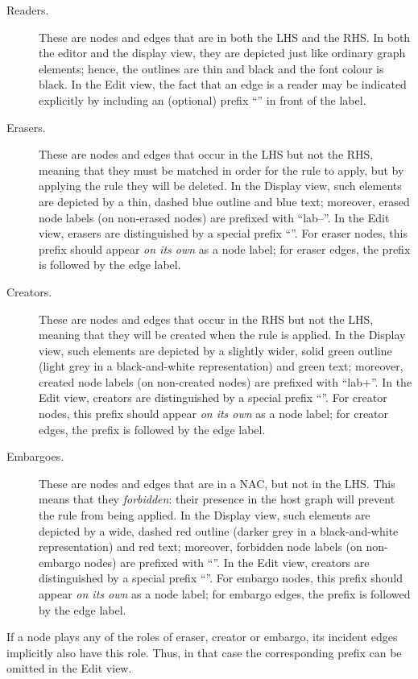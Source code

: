 \begin{description}
\item[Readers.] These are nodes and edges that are in both the LHS and the RHS.
  In both the editor and the display view, they are depicted just like ordinary
  graph elements; hence, the outlines are thin and black and the font colour is
  black. In the Edit view, the fact that an edge is a reader may be indicated
  explicitly by including an (optional) prefix ``\useP'' in front of the label.

\item[Erasers.] These are nodes and edges that occur in the LHS but not the
  RHS, meaning that they must be matched in order for the rule to apply, but by
  applying the rule they will be deleted. In the Display view, such elements
  are depicted by a thin, dashed blue outline and blue text; moreover, erased
  node labels (on non-erased nodes) are prefixed with ``lab{--}''. In the
  Edit view, erasers are distinguished by a special prefix ``\delP''. For
  eraser nodes, this prefix should appear \emph{on its own} as a node label;
  for eraser edges, the prefix is followed by the edge label.

\item[Creators.] These are nodes and edges that occur in the RHS but not the
  LHS, meaning that they will be created when the rule is applied. In the
  Display view, such elements are depicted by a slightly wider, solid green
  outline (light grey in a black-and-white representation) and green text;
  moreover, created node labels (on non-created nodes) are prefixed with
  ``lab{+}''. In the Edit view, creators are distinguished by a special
  prefix ``\newP''. For creator nodes, this prefix should appear \emph{on its
  own} as a node label; for creator edges, the prefix is followed by the edge
  label.

\item[Embargoes.] These are nodes and edges that are in a NAC, but not in the
  LHS. This means that they \emph{forbidden}: their presence in the host graph
  will prevent the rule from being applied. In the Display view, such elements
  are depicted by a wide, dashed red outline (darker grey in a black-and-white
  representation) and red text; moreover, forbidden node labels (on non-embargo
  nodes) are prefixed with ``\lab{!}''. In the Edit view, creators are
  distinguished by a special prefix ``\notP''. For embargo nodes, this prefix
  should appear \emph{on its own} as a node label; for embargo edges, the
  prefix is followed by the edge label.
\end{description}
%
If a node plays any of the roles of eraser, creator or embargo, its incident
edges implicitly also have this role. Thus, in that case the corresponding
prefix can be omitted in the Edit view.

